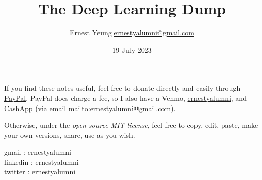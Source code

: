 \documentclass[10pt]{amsart}
\title{The Deep Learning Dump}
\author{Ernest Yeung \href{mailto:ernestyalumni@gmail.com}{ernestyalumni@gmail.com}}
\date{19 July 2023}
\begin{document}
	
	
\maketitle
	
If you find these notes useful, feel free to donate directly and easily through \href{https://www.paypal.com/cgi-bin/webscr?cmd=_donations&business=ernestsaveschristmas%2bpaypal%40gmail%2ecom&lc=US&item_name=ernestyalumni&currency_code=USD&bn=PP%2dDonationsBF%3abtn_donateCC_LG%2egif%3aNonHosted}{PayPal}. PayPal does charge a fee, so I also have a Venmo, \href{https://account.venmo.com/u/ernestyalumni}{ernestyalumni}, and CashApp (via email \url{mailto:ernestyalumni@gmail.com}).

Otherwise, under the \emph{open-source MIT license}, feel free to copy, edit, paste, make your own versions, share, use as you wish.    

\noindent gmail        : ernestyalumni \\
linkedin     : ernestyalumni \\
twitter      : ernestyalumni \\
		
\end{document}
